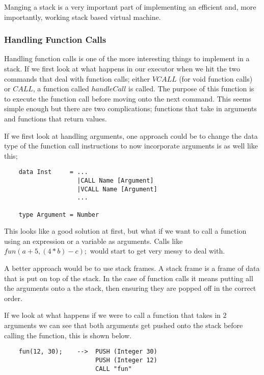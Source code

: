 Manging a stack is a very important part of implementing an efficient and, more importantly, working stack based virtual machine. 

\subsubsection{Handling Function Calls}

Handling function calls is one of the more interesting things to implement in a stack. If we first look at what happens in our executor when we hit the two commands that deal with function calls; either $VCALL$ (for void function calls) or $CALL$, a function called $handleCall$  is called. The purpose of this function is to execute the function call before moving onto the next command. This seems simple enough but there are two complications; functions that take in arguments and functions that return values.

If we first look at handling arguments, one approach could be to change the data type of the function call instructions to now incorporate arguments is as well like this;

\begin{lstlisting}
	data Inst     = ...
	                |CALL Name [Argument]
	                |VCALL Name [Argument]
	                ...
				
	type Argument = Number
\end{lstlisting}        

This looks like a good solution at first,  but what if we want to call a function using an expression or a variable as arguments. Calls like $fun(a+5,(4*b)-c);$ would start to get very messy to deal with. 

A better approach would be to use stack frames. A stack frame is a frame of data that is put on top of the stack. In the case of function calls it means putting all the arguments onto a the stack, then ensuring they are popped off in the correct order.   

If we look at what happens if we were to call a function that takes in 2 arguments we can see that both arguments get pushed onto the stack before calling the function, this is shown below.

\begin{lstlisting}
	fun(12, 30); 	-->  PUSH (Integer 30)
	                     PUSH (Integer 12)
        	             CALL "fun"	
\end{lstlisting}

